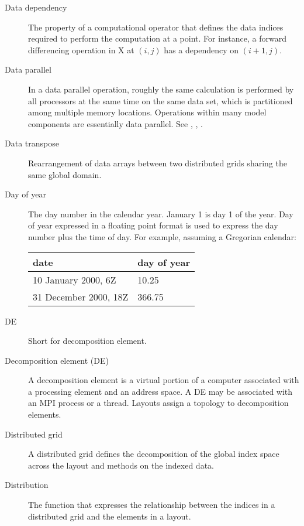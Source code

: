 \begin{description}
\item[Data dependency] \label{glos:DataDep} The property of a computational
  operator that defines the data indices required to perform
  the computation at a point.  For instance, a forward differencing
  operation in X at $(i,j)$ has a dependency on $(i+1,j)$.

\item[Data parallel] \label{glos:DataParallel} In a data parallel operation,
roughly the same calculation is performed by all processors at the same 
time on the same data set, which is partitioned among multiple memory 
locations.  Operations within many model components are essentially data 
parallel.  See , 
, .

\item[Data transpose] \label{glos:DataTranspose} Rearrangement of data arrays 
  between two distributed grids sharing the same global domain.

\item[Day of year] \label{glos:DayOfYear} The day number in the calendar year. 
January 1 is day 1 of the year. Day of year expressed in a floating point 
format is used to express the day number plus the time of day. 
For example, assuming a Gregorian calendar:

\begin{tabular}{ll}
{\bf date}              & {\bf day of year} \\
\hline 
10 January 2000, 6Z     & 10.25 \\
31 December 2000, 18Z   & 366.75 
\end{tabular}

\item[DE] \label{glos:DE} 
Short for decomposition element.

\item[Decomposition element (DE)] \label{glos:Decomp_Element}
A decomposition element is a virtual portion of a computer 
associated with a processing element and an address space.  A DE may 
be associated with an MPI process or a thread.  Layouts 
assign a topology to decomposition elements.

\item[Distributed grid] \label{glos:DistGrid}
  A distributed grid defines the decomposition of the global index space 
  across the layout and methods on the indexed data.

\item[Distribution] \label{glos:Distribution} The function that expresses
the relationship between the indices in a distributed grid and the elements 
in a layout.  


\end{description}
